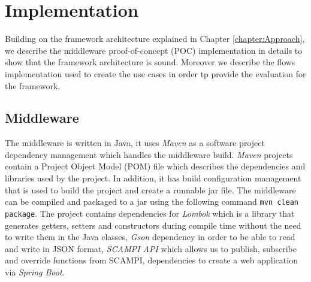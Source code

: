 
\chapter{Implementation}\label{chapter:implementation}
Building on the framework architecture explained in Chapter \ref{chapter:Approach}, we describe the middleware proof-of-concept (POC) implementation in details to show that the framework architecture is sound. Moreover we describe the flows implementation used to create the use cases in order tp provide the evaluation for the framework. \\

\section{Middleware}

 The middleware is written in Java, it uses \textit{Maven} as a  software project dependency management which handles the middleware build. \textit{Maven} projects contain a Project Object Model (POM) file which describes the dependencies and libraries used by the project. In addition, it has build configuration management that is used to build the project and create a runnable jar file. The middleware can be compiled and packaged to a jar using the following command \verb|mvn clean package|. The project contains dependencies for \textit{Lombok} which is a library that generates getters, setters and constructors during compile time without the need to write them in the Java classes, \textit{Gson} dependency in order to be able to read and write in JSON format, \textit{SCAMPI API} which allows us to publish, subscribe and override  functions from SCAMPI, dependencies to create a web application via \textit{Spring Boot}. \\
 
